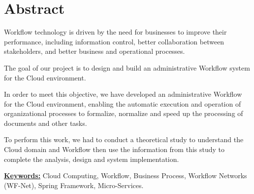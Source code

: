 \chapter*{Abstract}
\large
Workflow technology is driven by the need for businesses to improve their performance, including information control, better collaboration between stakeholders, and better business and operational processes.

The goal of our project is to design and build an administrative Workflow system for the Cloud environment.


In order to meet this objective, we have developed an administrative Workflow for the Cloud environment, enabling the automatic execution and operation of organizational processes to formalize, normalize and speed up the processing of documents and other tasks.

To perform this work, we had to conduct a theoretical study to understand the Cloud domain and Workflow then use the information from this study to complete the analysis, design and system implementation.


\textbf{\underline{Keywords:}}  Cloud Computing, Workflow, Business Process, Workflow Networks (WF-Net), Spring Framework, Micro-Services.
 
 \normalsize